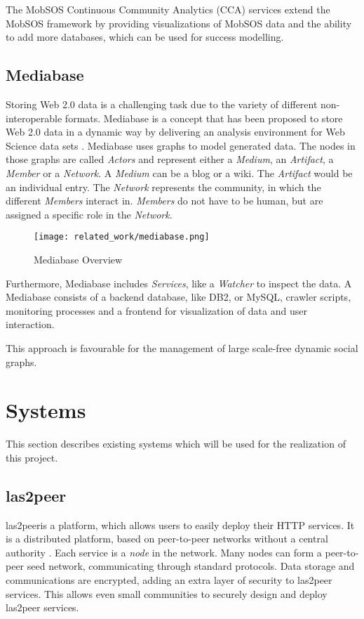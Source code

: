 The MobSOS Continuous Community Analytics (CCA) services extend the MobSOS framework by providing visualizations of MobSOS data and the ability to add more databases, which can be used for success modelling.

\subsection{Mediabase}
Storing Web 2.0 data is a challenging task due to the variety of different non-interoperable formats.
Mediabase is a concept that has been proposed to store Web 2.0 data in a dynamic way by delivering an analysis environment for Web Science data sets \cite{KlPe08}.
Mediabase uses graphs to model generated data.
The nodes in those graphs are called \emph{Actors} and represent either a \emph{ Medium}, an \emph{Artifact}, a \emph{Member} or a \emph{Network}.
A \emph{ Medium} can be a blog or a wiki.
The \emph{Artifact} would be an individual entry.
The \emph{Network} represents the community, in which the different \emph{Members} interact in.
\emph{Members} do not have to be human, but are assigned a specific role in the \emph{Network}.
\begin{figure}[h]
    \centering
    \texttt{[image: related\_work/mediabase.png]}
    \caption{Mediabase Overview \cite{Klam10e}}
\end{figure}
Furthermore, Mediabase includes \emph{Services}, like a \emph{Watcher} to inspect the data.
A Mediabase consists of a backend database, like DB2, or MySQL, crawler scripts, monitoring processes and a frontend for visualization of data and user interaction.

This approach is favourable for the management of large scale-free dynamic social graphs.

\section{Systems} \label{lab:systems}
This section describes existing systems which will be used for the realization of this project.

\subsection{las2peer}
las2peer\footnotemark is a platform, which allows users to easily deploy their HTTP services. 
It is a distributed platform, based on peer-to-peer networks without a central authority \cite{KRdJ16}.
Each service is a \emph{node} in the network. Many nodes can form a peer-to-peer seed network, communicating through standard protocols. 
Data storage and communications are encrypted, adding an extra layer of security to las2peer services.
This allows even small communities to securely design and deploy las2peer services. 

